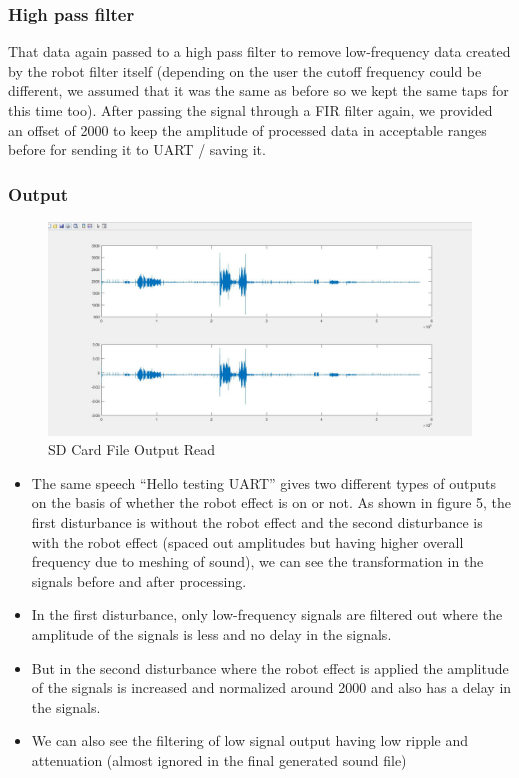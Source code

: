 \documentclass[11pt]{article}
\begin{document}
\subsubsection*{High pass filter}
\label{sec:org782e8a4}
That data again passed to a high pass filter to remove low-frequency data created by the robot filter itself (depending on the user the cutoff frequency could be different, we assumed that it was the same as before so we kept the same taps for this time too). After passing the signal through a FIR filter again, we provided an offset of 2000 to keep the amplitude of processed data in acceptable ranges before for sending it to UART / saving it.

\subsubsection*{Output}
\label{sec:orga878f54}
\begin{figure}[H]
    \centering
    \includegraphics[width=1\textwidth, trim={0cm 0cm 0cm 0cm}, clip]{SD_Read.pdf}
    \caption{SD Card File Output Read}
    \end{figure}

\begin{itemize}
\item The same speech ``Hello testing UART'' gives two different types of outputs on the basis of whether the robot effect is on or not. As shown in figure 5, the first disturbance is without the robot effect and the second disturbance is with the robot effect (spaced out amplitudes but having higher overall frequency due to meshing of sound), we can see the transformation in the signals before and after processing.
\item In the first disturbance, only low-frequency signals are filtered out where the amplitude of the signals is less and no delay in the signals.
\item But in the second disturbance where the robot effect is applied the amplitude of the signals is increased and normalized around 2000 and also has a delay in the signals.
\item We can also see the filtering of low signal output having low ripple and attenuation (almost ignored in the final generated sound file)
\end{itemize}
\end{document}
